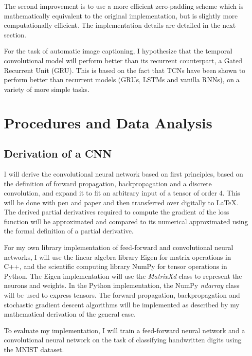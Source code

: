 \documentclass[a4paper, twoside]{article}
\begin{document}
The second improvement is to use a more efficient zero-padding scheme which is mathematically equivalent to the original implementation, but is slightly more computationally efficient. The implementation details are detailed in the next section.

For the task of automatic image captioning, I hypothesize that the temporal convolutional model will perform better than its recurrent counterpart, a Gated Recurrent Unit (GRU). This is based on the fact that TCNs have been shown to perform better than recurrent models (GRUs, LSTMs and vanilla RNNs), on a variety of more simple tasks.

\section{Procedures and Data Analysis}
\subsection{Derivation of a CNN}
I will derive the convolutional neural network based on first principles, based on the definition of forward propagation, backpropagation and a discrete convolution, and expand it to fit an arbitrary input of a tensor of order 4. This will be done with pen and paper and then transferred over digitally to LaTeX. The derived partial derivatives required to compute the gradient of the loss function will be approximated and compared to its numerical approximated using the formal definition of a partial derivative.

For my own library implementation of feed-forward and convolutional neural networks, I will use the linear algebra library Eigen for matrix operations in C++, and the scientific computing library NumPy for tensor operations in Python. The Eigen implementation will use the \textit{MatrixXd} class to represent the neurons and weights. In the Python implementation, the NumPy \textit{ndarray} class will be used to express tensors. The forward propagation, backpropagation and stochastic gradient descent algorithms will be implemented as described by my mathematical derivation of the general case.

To evaluate my implementation, I will train a feed-forward neural network and a convolutional neural network on the task of classifying handwritten digits using the MNIST dataset.
\end{document}
